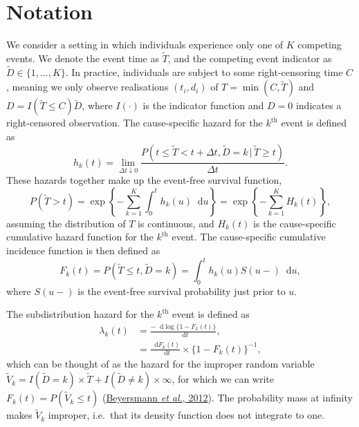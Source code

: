 \documentclass[
  letterpaper,
  DIV=11,
  numbers=noendperiod]{scrreprt}
\newcommand{\given}{\,|\,}
\newcommand\diff{\mathop{}\!\mathrm{d}}
\begin{document}
\hypertarget{sec-notation}{%
\section{Notation}\label{sec-notation}}

We consider a setting in which individuals experience only one of \(K\)
competing events. We denote the event time as \(\tilde{T}\), and the
competing event indicator as \(\tilde{D} \in \{1,...,K\}\). In practice,
individuals are subject to some right-censoring time \(C\), meaning we
only observe realisations \((t_i, d_i)\) of \(T = \min(C,\tilde{T})\)
and \(D = I(\tilde{T} \leq C)\tilde{D}\), where \(I(\cdot)\) is the
indicator function and \(D = 0\) indicates a right-censored observation.
The cause-specific hazard for the \(k^{\text{th}}\) event is defined
as\\
\begin{equation*} 
    h_k(t) = \lim_{\Delta t \downarrow 0} \frac{P(t \leq \tilde{T} < t + \Delta t, \tilde{D} = k \given \tilde{T} \geq t)}{\Delta t}.
\end{equation*} These hazards together make up the event-free survival
function, \begin{equation*}
    P(\tilde{T} > t) = \exp \left\{ - \sum_{k = 1}^{K} \int_{0}^{t} h_k(u)\diff u \right\} = \exp \left\{ - \sum_{k = 1}^{K} H_k(t) \right\},
\end{equation*} assuming the distribution of \(T\) is continuous, and
\(H_k(t)\) is the cause-specific cumulative hazard function for the
\(k^{\text{th}}\) event. The cause-specific cumulative incidence
function is then defined as \begin{equation*}
    F_k(t) = P(\tilde{T} \leq t, \tilde{D} = k) = \int_{0}^{t}h_k(u)S(u-)\diff u,
\end{equation*} where \(S(u-)\) is the event-free survival probability
just prior to \(u\).

The subdistribution hazard for the \(k^{\text{th}}\) event is defined as
\begin{align*}
    \lambda_k(t) &= \frac{-\diff \log \{1 - F_k(t)\}}{\diff t}, \\
    &= \frac{\diff F_k(t)}{\diff t} \times \{1 - F_k(t)\}^{-1}, 
\end{align*} which can be thought of as the hazard for the improper
random variable
\(\tilde{V}_k = I(\tilde{D} = k) \times \tilde{T} + I(\tilde{D} \neq k) \times \infty\),
for which we can write \(F_k(t) = P(\tilde{V}_k \leq t)\)
(\protect\hyperlink{ref-beyersmannCompetingRisksMultistate2012}{Beyersmann
\emph{et al.}, 2012}). The probability mass at infinity makes
\(\tilde{V}_k\) improper, i.e.~that its density function does not
integrate to one.
\end{document}
